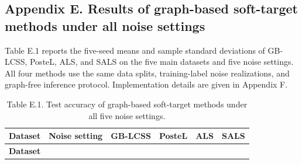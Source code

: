 \subsection{Appendix E. Results of graph-based soft-target methods under all noise settings}\label{appendix-e.-results-of-graph-based-soft-target-methods-under-all-noise-settings}

Table E.1 reports the five-seed means and sample standard deviations of GB-LCSS, PosteL, ALS, and SALS on the five main datasets and five noise settings. All four methods use the same data splits, training-label noise realizations, and graph-free inference protocol. Implementation details are given in Appendix F.

\begin{longtable}[]{@{}
  >{\raggedright\arraybackslash}p{}
  >{\centering\arraybackslash}p{}
  >{\centering\arraybackslash}p{}
  >{\centering\arraybackslash}p{}
  >{\centering\arraybackslash}p{}
  >{\centering\arraybackslash}p{}@{}}
\caption{Table E.1. Test accuracy of graph-based soft-target methods under all five noise settings.}\tabularnewline
\toprule\noalign{}
\begin{minipage}[b]{\linewidth}\raggedright
\textbf{Dataset}
\end{minipage} & \begin{minipage}[b]{\linewidth}\centering
\textbf{Noise setting}
\end{minipage} & \begin{minipage}[b]{\linewidth}\centering
\textbf{GB-LCSS}
\end{minipage} & \begin{minipage}[b]{\linewidth}\centering
\textbf{PosteL}
\end{minipage} & \begin{minipage}[b]{\linewidth}\centering
\textbf{ALS}
\end{minipage} & \begin{minipage}[b]{\linewidth}\centering
\textbf{SALS}
\end{minipage} \\
\midrule\noalign{}
\endfirsthead
\toprule\noalign{}
\begin{minipage}[b]{\linewidth}\raggedright
\textbf{Dataset}
\end{minipage} & \begin{minipage}[b]{\linewidth}\centering

\end{minipage}
\end{longtable}
